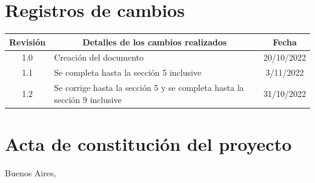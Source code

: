 \documentclass[
11pt, %
]{charter}
\begin{document}
\maketitle
\thispagestyle{empty}
\pagebreak


\thispagestyle{empty}
{\setlength{\parskip}{0pt}
\tableofcontents{}
}
\pagebreak


\section*{Registros de cambios}
\label{sec:registro}


\begin{table}[ht]
\label{tab:registro}
\centering
\begin{tabularx}{\linewidth}{@{}|c|X|c|@{}}
\hline
\rowcolor[HTML]{C0C0C0} 
Revisión & \multicolumn{1}{c|}{\cellcolor[HTML]{C0C0C0}Detalles de los cambios realizados} & Fecha      \\ \hline
1.0		& Creación del documento												& 20/10/2022 \\ \hline
1.1		& Se completa hasta la sección 5 inclusive							& 3/11/2022 \\ \hline
1.2		& Se corrige hasta la sección 5 y se completa hasta la sección 9 inclusive							& 31/10/2022 \\ \hline
\end{tabularx}
\end{table}

\pagebreak



\section*{Acta de constitución del proyecto}
\label{sec:acta}

\begin{flushright}
Buenos Aires, \fechaInicioName
\end{flushright}
\end{document}
